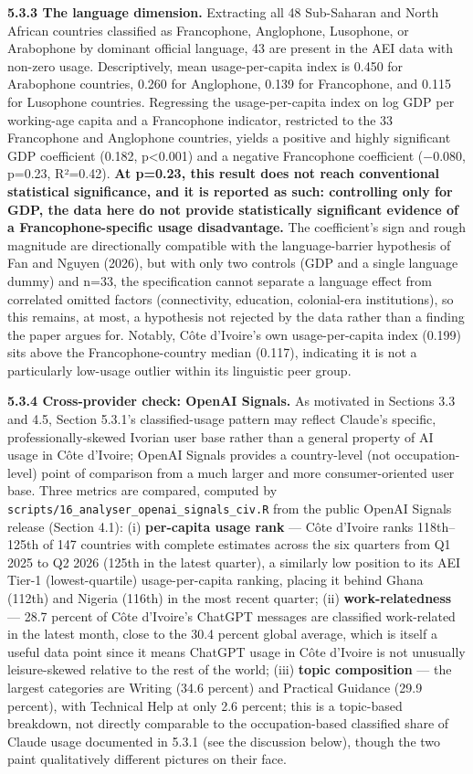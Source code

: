\documentclass[
  11pt,
]{article}
\begin{document}
\textbf{5.3.3 The language dimension.} Extracting all 48 Sub-Saharan and
North African countries classified as Francophone, Anglophone,
Lusophone, or Arabophone by dominant official language, 43 are present
in the AEI data with non-zero usage. Descriptively, mean
usage-per-capita index is 0.450 for Arabophone countries, 0.260 for
Anglophone, 0.139 for Francophone, and 0.115 for Lusophone countries.
Regressing the usage-per-capita index on log GDP per working-age capita
and a Francophone indicator, restricted to the 33 Francophone and
Anglophone countries, yields a positive and highly significant GDP
coefficient (0.182, p\textless0.001) and a negative Francophone
coefficient (−0.080, p=0.23, R²=0.42). \textbf{At p=0.23, this result
does not reach conventional statistical significance, and it is reported
as such: controlling only for GDP, the data here do not provide
statistically significant evidence of a Francophone-specific usage
disadvantage.} The coefficient's sign and rough magnitude are
directionally compatible with the language-barrier hypothesis of Fan and
Nguyen (2026), but with only two controls (GDP and a single language
dummy) and n=33, the specification cannot separate a language effect
from correlated omitted factors (connectivity, education, colonial-era
institutions), so this remains, at most, a hypothesis not rejected by
the data rather than a finding the paper argues for. Notably, Côte
d'Ivoire's own usage-per-capita index (0.199) sits above the
Francophone-country median (0.117), indicating it is not a particularly
low-usage outlier within its linguistic peer group.

\textbf{5.3.4 Cross-provider check: OpenAI Signals.} As motivated in
Sections 3.3 and 4.5, Section 5.3.1's classified-usage pattern may
reflect Claude's specific, professionally-skewed Ivorian user base
rather than a general property of AI usage in Côte d'Ivoire; OpenAI
Signals provides a country-level (not occupation-level) point of
comparison from a much larger and more consumer-oriented user base.
Three metrics are compared, computed by
\texttt{scripts/16\_analyser\_openai\_signals\_civ.R} from the public
OpenAI Signals release (Section 4.1): (i) \textbf{per-capita usage rank}
--- Côte d'Ivoire ranks 118th--125th of 147 countries with complete
estimates across the six quarters from Q1 2025 to Q2 2026 (125th in the
latest quarter), a similarly low position to its AEI Tier-1
(lowest-quartile) usage-per-capita ranking, placing it behind Ghana
(112th) and Nigeria (116th) in the most recent quarter; (ii)
\textbf{work-relatedness} --- 28.7 percent of Côte d'Ivoire's ChatGPT
messages are classified work-related in the latest month, close to the
30.4 percent global average, which is itself a useful data point since
it means ChatGPT usage in Côte d'Ivoire is not unusually leisure-skewed
relative to the rest of the world; (iii) \textbf{topic composition} ---
the largest categories are Writing (34.6 percent) and Practical Guidance
(29.9 percent), with Technical Help at only 2.6 percent; this is a
topic-based breakdown, not directly comparable to the occupation-based
classified share of Claude usage documented in 5.3.1 (see the discussion
below), though the two paint qualitatively different pictures on their
face.
\end{document}
